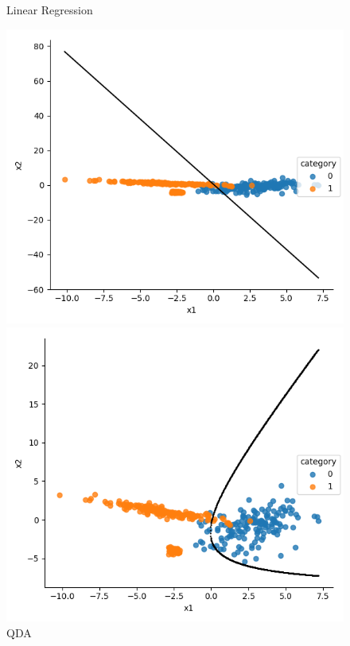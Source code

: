 \documentclass[a4paper]{article}
\begin{document}
\begin{figure}[h]
\begin{minipage}{0,45\textwidth}
\end{minipage}
\begin{minipage}{0,45\textwidth}
\caption{Linear Regression}
\includegraphics[scale=.45]{c_lr.png}
\end{minipage}
\begin{minipage}{0,45\textwidth}
\caption{QDA}
\includegraphics[scale=.45]{c_qda.png}
\end{minipage}
\end{figure}
\end{document}
